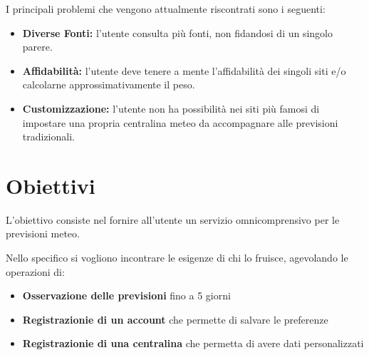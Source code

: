 I principali problemi che vengono attualmente riscontrati sono i seguenti:
\begin{itemize}
    \item \textbf{Diverse Fonti:} l'utente consulta più fonti, non fidandosi di un singolo parere.
    \item \textbf{Affidabilità:} l'utente deve tenere a mente l'affidabilità dei singoli siti e/o calcolarne approssimativamente il peso.
    \item \textbf{Customizzazione:} l'utente non ha possibilità nei siti più famosi di impostare una propria centralina meteo da accompagnare alle previsioni tradizionali.
\end{itemize}
 

\section{Obiettivi}
L'obiettivo consiste nel fornire all'utente un servizio omnicomprensivo per le previsioni meteo. 

Nello specifico si vogliono incontrare le esigenze di chi lo fruisce, agevolando le operazioni di:
\begin{itemize}
    \item \textbf{Osservazione delle previsioni} fino a 5 giorni
    \item \textbf{Registrazionie di un account} che permette di salvare le preferenze
    \item \textbf{Registrazionie di una centralina} che permetta di avere dati personalizzati
\end{itemize}





